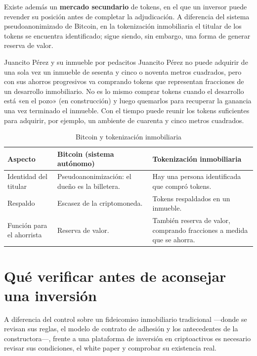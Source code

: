 \documentclass[12pt,oneside]{book}
\begin{document}
Existe además un \textbf{mercado secundario} de tokens, en el que un inversor puede revender su posición antes de completar la adjudicación. A diferencia del sistema pseudoanonimizado de Bitcoin, en la tokenización inmobiliaria el titular de los tokens se encuentra identificado; sigue siendo, sin embargo, una forma de generar reserva de valor.

\begin{example}{Juancito Pérez y su inmueble por pedacitos}
Juancito Pérez no puede adquirir de una sola vez un inmueble de sesenta y cinco o noventa metros cuadrados, pero con sus ahorros progresivos va comprando tokens que representan fracciones de un desarrollo inmobiliario. No es lo mismo comprar tokens cuando el desarrollo está «en el pozo» (en construcción) y luego quemarlos para recuperar la ganancia una vez terminado el inmueble. Con el tiempo puede reunir los tokens suficientes para adquirir, por ejemplo, un ambiente de cuarenta y cinco metros cuadrados.
\end{example}

\begin{table}[H]
\centering
\caption{Bitcoin y tokenización inmobiliaria}
\renewcommand{\arraystretch}{1.2}
\begin{tabularx}{\textwidth}{>{\raggedright\arraybackslash}p{}XX}
\toprule
\textbf{Aspecto} & \textbf{Bitcoin (sistema autónomo)} & \textbf{Tokenización inmobiliaria} \\
\midrule
Identidad del titular & Pseudoanonimización: el dueño es la billetera. & Hay una persona identificada que compró tokens. \\
Respaldo & Escasez de la criptomoneda. & Tokens respaldados en un inmueble. \\
Función para el ahorrista & Reserva de valor. & También reserva de valor, comprando fracciones a medida que se ahorra. \\
\bottomrule
\end{tabularx}
\end{table}

\section{Qué verificar antes de aconsejar una inversión}
\label{sec:verificar}

A diferencia del control sobre un fideicomiso inmobiliario tradicional ---donde se revisan sus reglas, el modelo de contrato de adhesión y los antecedentes de la constructora---, frente a una plataforma de inversión en criptoactivos es necesario revisar sus condiciones, el white paper y comprobar su existencia real.
\end{document}
